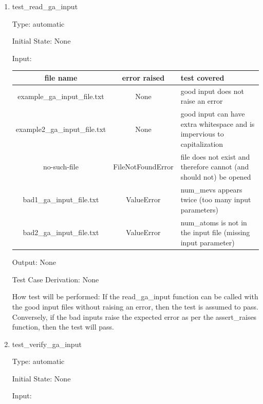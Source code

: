 \documentclass[12pt, titlepage]{article}
\begin{document}
\begin{enumerate}

\item{test\_read\_ga\_input\\}

Type: automatic
					
Initial State: None
					
Input: 

\begin{table}[H]
	\begin{tabular}{ccp{4cm}}
		\toprule
		file name & error raised & test covered \\
		\midrule
		example\_ga\_input\_file.txt & None & good input does not raise an 
		error \\
		example2\_ga\_input\_file.txt & None & good input can have extra 
		whitespace and is impervious to capitalization \\
		no-such-file & FileNotFoundError & file does not exist and therefore 
		cannot (and should not) be opened \\
		bad1\_ga\_input\_file.txt & ValueError & num\_mevs appears twice (too 
		many input parameters) \\
		bad2\_ga\_input\_file.txt & ValueError & num\_atoms is not in the input 
		file (missing input parameter) \\
	\end{tabular}
\end{table}
					
Output: None

Test Case Derivation: None

How test will be performed: If the read\_ga\_input function can be called with 
the good input files without raising an error, then the test is assumed to 
pass. Conversely, if the bad inputs raise the expected error as per the 
assert\_raises function, then the test will pass.
					
\item{test\_verify\_ga\_input\\}

Type: automatic
					
Initial State: None
					
Input:


\end{enumerate}
\end{document}
